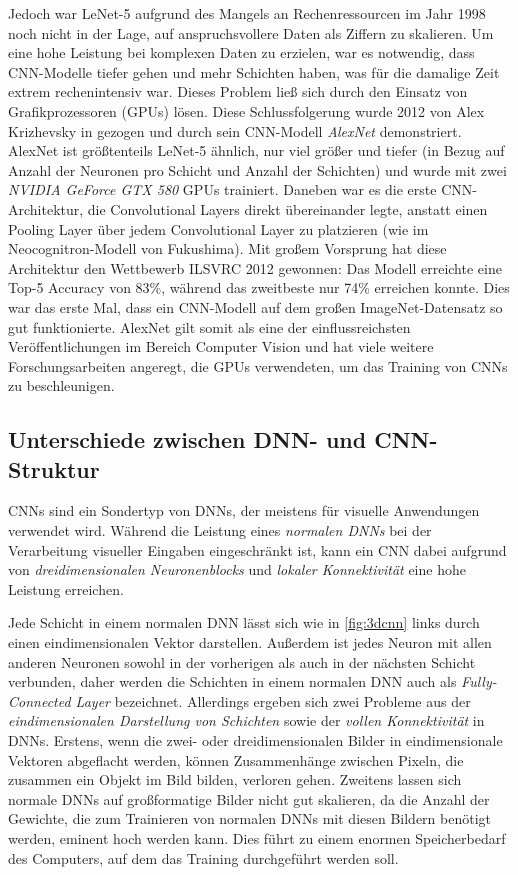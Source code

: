 \begin{description}
	Jedoch war LeNet-5 aufgrund des Mangels an Rechenressourcen im Jahr 1998 noch nicht in der Lage, auf anspruchsvollere Daten als Ziffern zu skalieren. Um eine hohe Leistung bei komplexen Daten zu erzielen, war es notwendig, dass CNN-Modelle tiefer gehen und mehr Schichten haben, was für die damalige Zeit extrem rechenintensiv war. Dieses Problem ließ sich durch den Einsatz von Grafikprozessoren (GPUs) lösen. Diese Schlussfolgerung wurde 2012 von Alex Krizhevsky in \cite{10.1145/3065386} gezogen und durch sein CNN-Modell \emph{AlexNet} demonstriert. AlexNet ist größtenteils LeNet-5 ähnlich, nur viel größer und tiefer (in Bezug auf Anzahl der Neuronen pro Schicht und Anzahl der Schichten) und wurde mit zwei \emph{NVIDIA GeForce GTX 580} GPUs trainiert. Daneben war es die erste CNN-Architektur, die Convolutional Layers direkt übereinander legte, anstatt einen Pooling Layer über jedem Convolutional Layer zu platzieren (wie im Neocognitron-Modell von Fukushima). Mit großem Vorsprung hat diese Architektur den Wettbewerb ILSVRC 2012 gewonnen: Das Modell erreichte eine Top-5 Accuracy von 83\%, während das zweitbeste nur 74\% erreichen konnte. Dies war das erste Mal, dass ein CNN-Modell auf dem großen ImageNet-Datensatz so gut funktionierte. AlexNet gilt somit als eine der einflussreichsten Veröffentlichungen im Bereich Computer Vision und hat viele weitere Forschungsarbeiten angeregt, die GPUs verwendeten, um das Training von CNNs zu beschleunigen.
	
\end{description}

\subsection{Unterschiede zwischen DNN- und CNN-Struktur}

CNNs sind ein Sondertyp von DNNs, der meistens für visuelle Anwendungen verwendet wird. Während die Leistung eines \emph{normalen DNNs} bei der Verarbeitung visueller Eingaben eingeschränkt ist, kann ein CNN dabei aufgrund von \emph{dreidimensionalen Neuronenblocks} und \emph{lokaler Konnektivität} eine hohe Leistung erreichen. 

Jede Schicht in einem normalen DNN lässt sich wie in \autoref{fig:3dcnn} links durch einen eindimensionalen Vektor darstellen. Außerdem ist jedes Neuron mit allen anderen Neuronen sowohl in der vorherigen als auch in der nächsten Schicht verbunden, daher werden die Schichten in einem normalen DNN auch als \emph{Fully-Connected Layer} bezeichnet. Allerdings ergeben sich zwei Probleme aus der \emph{eindimensionalen Darstellung von Schichten} sowie der \emph{vollen Konnektivität} in DNNs. Erstens, wenn die zwei- oder dreidimensionalen Bilder in eindimensionale Vektoren abgeflacht werden, können Zusammenhänge zwischen Pixeln, die zusammen ein Objekt im Bild bilden, verloren gehen. Zweitens lassen sich normale DNNs auf großformatige Bilder nicht gut skalieren, da die Anzahl der Gewichte, die zum Trainieren von normalen DNNs mit diesen Bildern benötigt werden, eminent hoch werden kann. Dies führt zu einem enormen Speicherbedarf des Computers, auf dem das Training durchgeführt werden soll.

